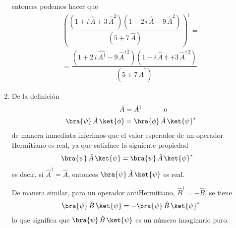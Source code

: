 \begin{enumerate}
entonces podemos hacer que
\begin{align*}
\left( \dfrac{(1 + i \, \hat{A} + 3 \, \hat{A}^{2})(1 - 2 \, i \, \hat{A} - 9 \, \hat{A}^{2})}{(5 + 7 \, \hat{A})} \right)^{\dagger} = \\[0.5em]
= \dfrac{(1 + 2 \, i \, \hat{A^{\dagger}} - 9 \, \hat{A}^{\dagger \, 2})(1 - i \, \hat{A}{\dagger} + 3 \, \hat{A}^{{\dagger} \, 2})}{(5 + 7 \, \hat{A}^{\dagger})}
\end{align*}
\item De la definición
\begin{align*}
\hat{A} &= \hat{A}^{\dagger}  \hspace{1cm} \mbox{ o } \\
\bra{\psi} \, \hat{A} \, \ket{\phi} &= \bra{\phi} \, \hat{A} \, \ket{\psi}^{*}
\end{align*}
de manera inmediata inferimos que el valor esperador de un operador Hermitiano es real, ya que satisface la siguiente propiedad
\begin{align*}
\bra{\psi} \, \hat{A} \, \ket{\psi} &= \bra{\psi} \, \hat{A} \, \ket{\psi}^{*}
\end{align*}
es decir, si $\hat{A}^{\dagger} = \hat{A}$, entonces $\bra{\psi} \, \hat{A} \, \ket{\psi}$ es real.
\par
De manera similar, para un operador antiHermitiano, $\hat{B}^{\dagger} = - \hat{B}$, se tiene
\begin{align*}
\bra{\psi} \, \hat{B} \, \ket{\psi} = - \bra{\psi} \, \hat{B} \, \ket{\psi}^{*}
\end{align*}
lo que significa que $\bra{\psi} \, \hat{B} \, \ket{\psi}$ es un número imaginario puro.
\end{enumerate}
